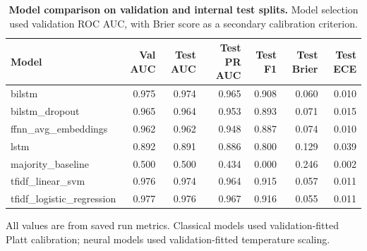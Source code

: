 \begin{table}[!ht]
\centering
\caption{\textbf{Model comparison on validation and internal test splits.} Model selection used validation ROC AUC, with Brier score as a secondary calibration criterion.}
\small
\begin{tabular}{lrrrrrr}
\hline
Model & Val AUC & Test AUC & Test PR AUC & Test F1 & Test Brier & Test ECE \\
\hline
bilstm & 0.975 & 0.974 & 0.965 & 0.908 & 0.060 & 0.010 \\
bilstm\_dropout & 0.965 & 0.964 & 0.953 & 0.893 & 0.071 & 0.015 \\
ffnn\_avg\_embeddings & 0.962 & 0.962 & 0.948 & 0.887 & 0.074 & 0.010 \\
lstm & 0.892 & 0.891 & 0.886 & 0.800 & 0.129 & 0.039 \\
majority\_baseline & 0.500 & 0.500 & 0.434 & 0.000 & 0.246 & 0.002 \\
tfidf\_linear\_svm & 0.976 & 0.974 & 0.964 & 0.915 & 0.057 & 0.011 \\
tfidf\_logistic\_regression & 0.977 & 0.976 & 0.967 & 0.916 & 0.055 & 0.011 \\
\hline
\end{tabular}
\begin{flushleft}\footnotesize All values are from saved run metrics. Classical models used validation-fitted Platt calibration; neural models used validation-fitted temperature scaling.\end{flushleft}
\label{tab:model-comparison}
\end{table}
